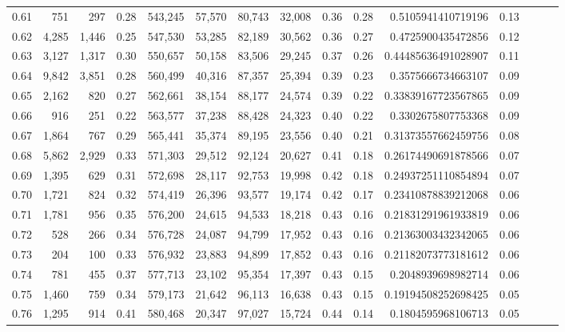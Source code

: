 \begin{tabular}{rrrrrrrrrrrrrrr}
0.61 &     751 &     297 &  0.28 &  543,245 &   57,570 &   80,743 &   32,008 &  0.36 &  0.28 &    0.5105941410719196 &      0.13 \\
0.62 &   4,285 &   1,446 &  0.25 &  547,530 &   53,285 &   82,189 &   30,562 &  0.36 &  0.27 &    0.4725900435472856 &      0.12 \\
0.63 &   3,127 &   1,317 &  0.30 &  550,657 &   50,158 &   83,506 &   29,245 &  0.37 &  0.26 &   0.44485636491028907 &      0.11 \\
0.64 &   9,842 &   3,851 &  0.28 &  560,499 &   40,316 &   87,357 &   25,394 &  0.39 &  0.23 &    0.3575666734663107 &      0.09 \\
0.65 &   2,162 &     820 &  0.27 &  562,661 &   38,154 &   88,177 &   24,574 &  0.39 &  0.22 &   0.33839167723567865 &      0.09 \\
0.66 &     916 &     251 &  0.22 &  563,577 &   37,238 &   88,428 &   24,323 &  0.40 &  0.22 &    0.3302675807753368 &      0.09 \\
0.67 &   1,864 &     767 &  0.29 &  565,441 &   35,374 &   89,195 &   23,556 &  0.40 &  0.21 &   0.31373557662459756 &      0.08 \\
0.68 &   5,862 &   2,929 &  0.33 &  571,303 &   29,512 &   92,124 &   20,627 &  0.41 &  0.18 &   0.26174490691878566 &      0.07 \\
0.69 &   1,395 &     629 &  0.31 &  572,698 &   28,117 &   92,753 &   19,998 &  0.42 &  0.18 &   0.24937251110854894 &      0.07 \\
0.70 &   1,721 &     824 &  0.32 &  574,419 &   26,396 &   93,577 &   19,174 &  0.42 &  0.17 &   0.23410878839212068 &      0.06 \\
0.71 &   1,781 &     956 &  0.35 &  576,200 &   24,615 &   94,533 &   18,218 &  0.43 &  0.16 &   0.21831291961933819 &      0.06 \\
0.72 &     528 &     266 &  0.34 &  576,728 &   24,087 &   94,799 &   17,952 &  0.43 &  0.16 &   0.21363003432342065 &      0.06 \\
0.73 &     204 &     100 &  0.33 &  576,932 &   23,883 &   94,899 &   17,852 &  0.43 &  0.16 &   0.21182073773181612 &      0.06 \\
0.74 &     781 &     455 &  0.37 &  577,713 &   23,102 &   95,354 &   17,397 &  0.43 &  0.15 &    0.2048939698982714 &      0.06 \\
0.75 &   1,460 &     759 &  0.34 &  579,173 &   21,642 &   96,113 &   16,638 &  0.43 &  0.15 &   0.19194508252698425 &      0.05 \\
0.76 &   1,295 &     914 &  0.41 &  580,468 &   20,347 &   97,027 &   15,724 &  0.44 &  0.14 &    0.1804595968106713 &      0.05 \\

\end{tabular}

